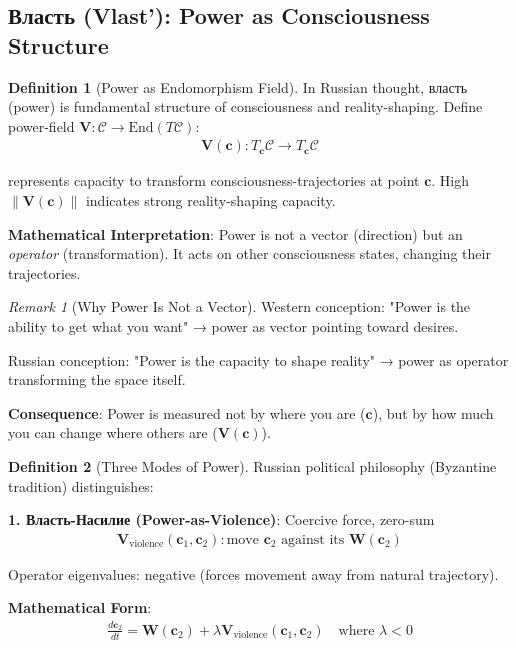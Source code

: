 \documentclass[11pt,a4paper]{article}
\theoremstyle{definition}
\newtheorem{definition}{Definition}[section]
\theoremstyle{remark}
\newtheorem{remark}{Remark}[section]
\newcommand{\CC}{\mathcal{C}}
\newcommand{\WW}{\mathbf{W}}
\newcommand{\VV}{\mathbf{V}}
\newcommand{\cc}{\mathbf{c}}
\newcommand{\norm}[1]{\left\|#1\right\|}
\begin{document}
\begin{enumerate}
\subsection{Власть (Vlast'): Power as Consciousness Structure}

\begin{definition}[Power as Endomorphism Field]
In Russian thought, власть (power) is fundamental structure of consciousness and reality-shaping. Define power-field \(\VV: \CC \to \text{End}(T\CC)\):
\begin{align}
\VV(\cc): T_{\cc}\CC \to T_{\cc}\CC
\end{align}

represents capacity to transform consciousness-trajectories at point \(\cc\). High \(\norm{\VV(\cc)}\) indicates strong reality-shaping capacity.

\textbf{Mathematical Interpretation}: Power is not a vector (direction) but an \textit{operator} (transformation). It acts on other consciousness states, changing their trajectories.
\end{definition}

\begin{remark}[Why Power Is Not a Vector]
Western conception: "Power is the ability to get what you want" → power as vector pointing toward desires.

Russian conception: "Power is the capacity to shape reality" → power as operator transforming the space itself.

\textbf{Consequence}: Power is measured not by where you are (\(\cc\)), but by how much you can change where others are (\(\VV(\cc)\)).
\end{remark}

\begin{definition}[Three Modes of Power]
Russian political philosophy (Byzantine tradition) distinguishes:

\textbf{1. Власть-Насилие (Power-as-Violence)}: Coercive force, zero-sum
\begin{align}
\VV_{\text{violence}}(\cc_1, \cc_2): \text{move } \cc_2 \text{ against its } \WW(\cc_2)
\end{align}

Operator eigenvalues: negative (forces movement away from natural trajectory).

\textbf{Mathematical Form}:
\begin{align}
\frac{d\cc_2}{dt} = \WW(\cc_2) + \lambda \VV_{\text{violence}}(\cc_1, \cc_2) \quad \text{where } \lambda < 0
\end{align}


\end{definition}
\end{enumerate}
\end{document}
